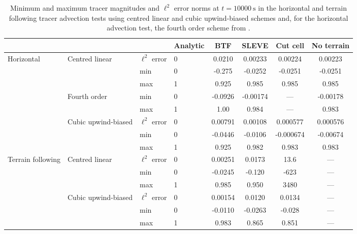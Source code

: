 \documentclass[twocol]{ametsoc}
\begin{document}
\begin{table*}[t]
	\caption{Minimum and maximum tracer magnitudes and \(\ell^2\) error norms at \(t = \SI{10000}{\second}\) in the horizontal and terrain following tracer advection tests using centred linear and cubic upwind-biased schemes and, for the horizontal advection test, the fourth order scheme from \citet{schaer2002}.}
\label{tab:advection}
%
\centering
\footnotesize
\begin{tabular}{l l l l S S S S}
\hline\hline
                  &                     &                  & Analytic & {BTF}   & {SLEVE}         & {Cut cell}     & {No terrain} \\
\hline
Horizontal        & Centred linear      & \(\ell^2\) error & 0        & 0.0210  & 0.00233         & 0.00224        & 0.00223     \\
                  &                     & min              & 0        & -0.275  & -0.0252         & -0.0251        & -0.0251     \\
                  &                     & max              & 1        & 0.925   & 0.985           & 0.985          & 0.985       \\
                  & Fourth order        & min              & 0        & -0.0926 & -0.00174        & {---}          & -0.00178    \\
                  &                     & max              & 1        & 1.00    & 0.984           & {---}          & 0.983       \\
                  & Cubic upwind-biased & \(\ell^2\) error & 0        & 0.00791 & 0.00108         & 0.000577       & 0.000576    \\
                  &                     & min              & 0        & -0.0446 & -0.0106         & -0.000674      & -0.00674    \\
                  &                     & max              & 1        & 0.925   & 0.982           & 0.983          & 0.983       \\
\hline
Terrain following & Centred linear      & \(\ell^2\) error & 0        & 0.00251 & 0.0173          & 13.6           & {---}        \\
		  &                     & min              & 0        & -0.0245 & -0.120          & -623           & {---}        \\
                  &                     & max              & 1        & 0.985   & 0.950           & 3480           & {---}        \\
		  & Cubic upwind-biased & \(\ell^2\) error & 0        & 0.00154 & 0.0120          & 0.0134         & {---}        \\
                  &                     & min              & 0        & -0.0110 & -0.0263         & -0.028         & {---}        \\
                  &                     & max              & 1        & 0.983   & 0.865           & 0.851          & {---}        \\
\hline
\end{tabular}
\end{table*}
\end{document}
